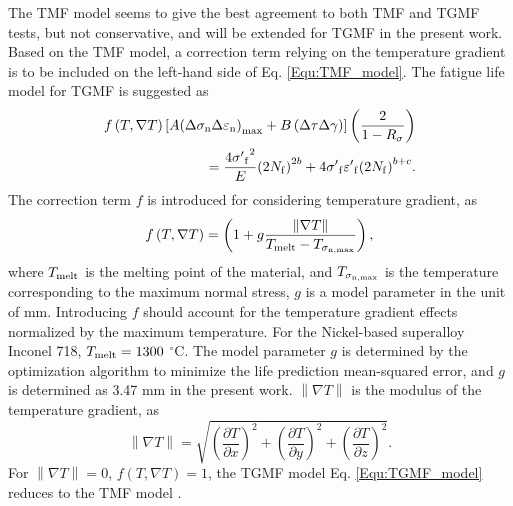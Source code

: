 \documentclass[preprint,5p,twocolumn,10pt,sort&compress]{elsarticle}
\begin{document}
The TMF model \cite{SUN2019228} seems to give the best agreement to both TMF and TGMF tests, but not conservative, and will be extended for TGMF in the present work.
Based on the TMF model, a correction term relying on the temperature gradient is to be included on the left-hand side of Eq. \eqref{Equ:TMF_model}. The fatigue life model for TGMF is suggested as
\begin{equation}
\begin{aligned}
f\left( {T,\nabla T} \right)\left[ {A{{\left( {\Delta {\sigma _{\rm n}}\Delta {\varepsilon _{\rm n}}} \right)}_{\max }} + B\left( {\Delta \tau \Delta \gamma } \right)} \right]\left( {\frac{2}{{1 - {R_\sigma }}}} \right) \\ 
= \frac{{4{{\sigma '}_{\rm f}}^2}}{E}{\left( {2{N_{\rm f}}} \right)^{2b}} + 4{{\sigma '}_{\rm f}}{{\varepsilon '}_{\rm f}}{\left( {2{N_{\rm f}}} \right)^{b + c}}.
\end{aligned}
\label{Equ:TGMF_model}
\end{equation}
The correction term $f$ is introduced for considering temperature gradient, as
\begin{equation}
f\left( {T,\nabla T} \right) = \left( {1 + g\frac{{\left\| {\nabla T} \right\|}}{{{T_{{\rm{melt}}}} - {T_{{\sigma _{\rm n,\max }}}}}}} \right),
\label{Equ:TGMF_term}
\end{equation}
where ${T_{{\rm{melt}}}}$ is the melting point of the material, and ${T_{{\sigma _{\rm n,\max }}}}$ is the temperature corresponding to the maximum normal stress, $g$ is a model parameter in the unit of mm. Introducing $f$ should account for the temperature gradient effects normalized by the maximum temperature. For the Nickel-based superalloy Inconel 718, ${T_{{\rm{melt}}}}=1300$ $^\circ$C. The model parameter $g$ is determined by the optimization algorithm to minimize the life prediction
mean-squared error, and $g$ is determined as 3.47 mm in the present work. ${\left\| {\nabla T} \right\|}$ is the modulus of the temperature gradient, as
\begin{equation}
\left\| {\nabla T} \right\| = \sqrt {{{\left( {\frac{{\partial T}}{{\partial x}}} \right)}^2} + {{\left( {\frac{{\partial T}}{{\partial y}}} \right)}^2} + {{\left( {\frac{{\partial T}}{{\partial z}}} \right)}^2}}.
\end{equation}
For $\left\| {\nabla T} \right\|=0$, $f\left( {T,\nabla T} \right)=1$, the TGMF model Eq. \eqref{Equ:TGMF_model} reduces to the TMF model \cite{SUN2019228}.
\end{document}
